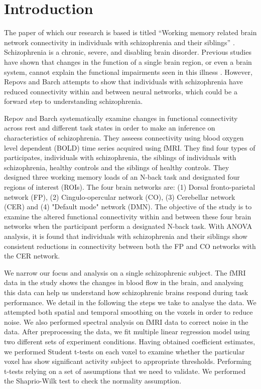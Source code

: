 \section{Introduction}

\par The paper of which our research is based is titled ``Working memory related
brain network connectivity in individuals with schizophrenia and their
siblings'' \cite{repovs_barch1, repovs_barch2}. Schizophrenia is a chronic,
severe, and disabling brain disorder. Previous studies have shown that changes
in the function of a single brain region, or even a brain system, cannot explain
the functional impairments seen in this illness \cite{repovs_barch1}.
However, Repovs and Barch attempts to show that individuals with schizophrenia
have reduced connectivity within and between neural networks, which could be a
forward step to understanding schizophrenia. 

Repov and Barch systematically examine changes in functional connectivity across
rest and different task states in order to make an inference on characteristics
of schizophrenia. They asseess connectivity using blood oxygen level dependent
(BOLD) time series acquired using fMRI. They find four types of participates, individuals with
schizophrenia, the siblings of individuals with schizophrenia, healthy controls
and the siblings of healthy controls. They designed three working memory loads
of an N-back task and designated four regions of interest (ROIs). The four brain
networks are: (1) Dorsal fronto-parietal network (FP), (2) Cingulo-opercular
network (CO), (3) Cerebellar network (CER) and (4) "Default mode" network (DMN).
The objective of the study is to examine the altered functional connectivity
within and between these four brain networks when the participant perform a
designated N-back task. With ANOVA analysis, it is found that individuals with
schizophrenia and their siblings show consistent reductions in connectivity
between both the FP and CO networks with the CER network. 

We narrow our focus and analysis on a single schizophrenic
subject. The fMRI data in the study shows the changes in
blood flow in the brain, and analysing this data can help us understand how
schizophrenic brains respond during task performance. We detail in the following the steps
we take to analyse the data. We attempted both spatial and temporal smoothing on
the voxels in order to reduce noise. We also performed spectral analysis on fMRI data to
correct noise in the data. After preprocessing the data, we fit
multiple linear regression model using two different sets of experiment
conditions. Having obtained coefficient estimates, we performed Student t-tests
on each voxel to examine whether the particular voxel has show significant
activity subject to appropriate thresholds. Performing t-tests relying on a set
of assumptions that we need to validate. We performed the Shaprio-Wilk test to
check the normality assumption.

